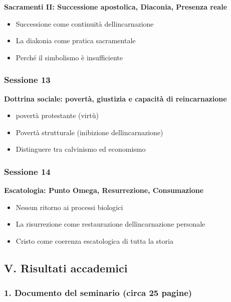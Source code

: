 \documentclass[
]{article}
\begin{document}
\textbf{Sacramenti II: Successione apostolica, Diaconia, Presenza reale}

\begin{itemize}
\item
  Successione come continuità dell\textquotesingle incarnazione
\item
  La diakonia come pratica sacramentale
\item
  Perché il simbolismo è insufficiente
\end{itemize}

\subsubsection{\texorpdfstring{\textbf{Sessione 13}}{Sessione 13}}\label{sessione-13}

\textbf{Dottrina sociale: povertà, giustizia e capacità di reincarnazione}

\begin{itemize}
\item
  povertà protestante (virtù)
\item
  Povertà strutturale (inibizione dell\textquotesingle incarnazione)
\item
  Distinguere tra calvinismo ed economismo
\end{itemize}

\subsubsection{\texorpdfstring{\textbf{Sessione 14}}{Sessione 14}}\label{sessione-14}

\textbf{Escatologia: Punto Omega, Resurrezione, Consumazione}

\begin{itemize}
\item
  Nessun ritorno ai processi biologici
\item
  La risurrezione come restaurazione dell\textquotesingle incarnazione personale
\item
  Cristo come coerenza escatologica di tutta la storia
\end{itemize}

\subsection{\texorpdfstring{\textbf{V. Risultati accademici}}{V. Risultati accademici}}\label{v.-risultati-accademici}

\subsubsection{\texorpdfstring{\textbf{1. Documento del seminario (circa 25 pagine)}}{1. Documento del seminario (circa 25 pagine)}}\label{documento-del-seminario-circa-25-pagine}
\end{document}
